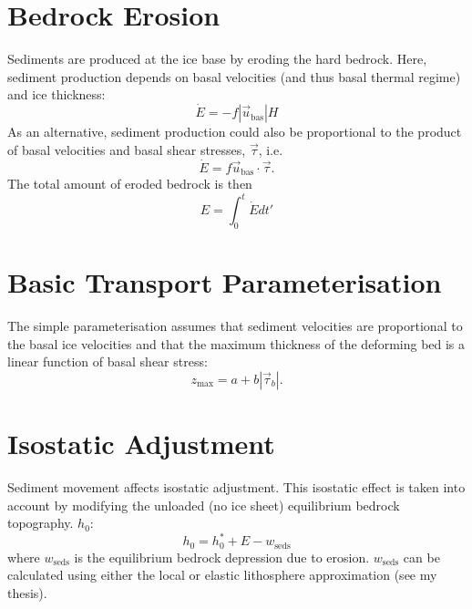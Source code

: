 \section{Bedrock Erosion}\label{erosion.sec.hb}
Sediments are produced at the ice base by eroding the hard bedrock. Here, sediment production depends on basal velocities (and thus basal thermal regime) and ice thickness:
\begin{equation}
  \dot{E} = -f|\vec{u}_{\text{bas}}|H
\end{equation}
As an alternative, sediment production could also be proportional to the product of basal velocities and basal shear stresses, $\vec{\tau}$, i.e.
\begin{equation}
  \dot{E} = f\vec{u}_{\text{bas}}\cdot\vec{\tau}.
\end{equation}
The total amount of eroded bedrock is then
\begin{equation}
  E=\int_{0}^t\dot{E}dt'
\end{equation}

\section{Basic Transport Parameterisation}\label{erosion.sec.basic_trans}
The simple parameterisation assumes that sediment velocities are proportional to the basal ice velocities and that the maximum thickness of the deforming bed is a linear function of basal shear stress:
\begin{equation}
  z_{\text{max}} = a+b|\vec{\tau}_b|.
\end{equation}



\section{Isostatic Adjustment}
Sediment movement affects isostatic adjustment. This isostatic effect is taken into account by modifying the unloaded (no ice sheet) equilibrium bedrock topography. $h_0$:
\begin{equation}
  h_0=h_0^\ast+E-w_{\text{seds}}
\end{equation}
where $w_{\text{seds}}$ is the equilibrium bedrock depression due to erosion. $w_{\text{seds}}$ can be calculated using either the local or elastic lithosphere approximation (see my thesis).
